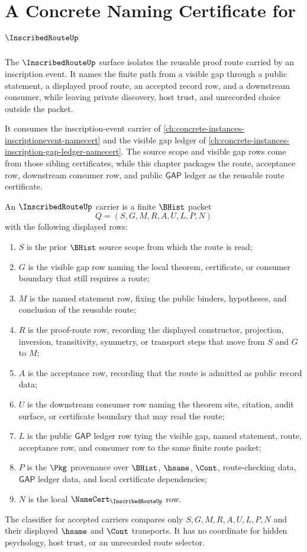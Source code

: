 \chapter{A Concrete Naming Certificate for $\InscribedRouteUp$}
\label{ch:concrete-instances-inscribedroute-namecert}

The $\InscribedRouteUp$ surface isolates the reusable proof route carried by an inscription event. It names the finite path from a visible gap through a public statement, a displayed proof route, an accepted record row, and a downstream consumer, while leaving private discovery, host trust, and unrecorded choice outside the packet.

It consumes the inscription-event carrier of \autoref{ch:concrete-instances-inscriptionevent-namecert} and the visible gap ledger of \autoref{ch:concrete-instances-inscription-gap-ledger-namecert}. The source scope and visible gap rows come from those sibling certificates, while this chapter packages the route, acceptance row, downstream consumer row, and public $\mathsf{GAP}$ ledger as the reusable route certificate.

\begin{definition}
\label{def:inscribed-route-carrier}
An $\InscribedRouteUp$ carrier is a finite $\BHist$ packet
$$
Q=(S,G,M,R,A,U,L,P,N)
$$
with the following displayed rows:
\begin{enumerate}
\item $S$ is the prior $\BHist$ source scope from which the route is read;
\item $G$ is the visible gap row naming the local theorem, certificate, or consumer boundary that still requires a route;
\item $M$ is the named statement row, fixing the public binders, hypotheses, and conclusion of the reusable route;
\item $R$ is the proof-route row, recording the displayed constructor, projection, inversion, transitivity, symmetry, or transport steps that move from $S$ and $G$ to $M$;
\item $A$ is the acceptance row, recording that the route is admitted as public record data;
\item $U$ is the downstream consumer row naming the theorem site, citation, audit surface, or certificate boundary that may read the route;
\item $L$ is the public $\mathsf{GAP}$ ledger row tying the visible gap, named statement, route, acceptance row, and consumer row to the same finite route packet;
\item $P$ is the $\Pkg$ provenance over $\BHist$, $\hsame$, $\Cont$, route-checking data, $\mathsf{GAP}$ ledger data, and local certificate dependencies;
\item $N$ is the local $\NameCert_{\InscribedRouteUp}$ row.
\end{enumerate}
The classifier for accepted carriers compares only $S,G,M,R,A,U,L,P,N$ and their displayed $\hsame$ and $\Cont$ transports. It has no coordinate for hidden psychology, host trust, or an unrecorded route selector.
\end{definition}

